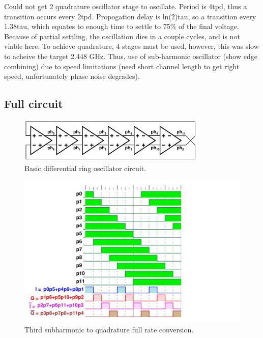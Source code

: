 	 Could not get 2 quadrature oscillator stage to oscillate. Period is 4tpd, thus a transition occurs every 2tpd. Propogation delay is ln(2)tau, so a transition every 1.38tau, which equates to enough time to settle to 75\% of the final voltage. Because of partial settling, the oscillation dies in a couple cycles, and is not viable here. To achieve quadrature, 4 stages must be used, however, this was slow to acheive the target 2.448 GHz. Thus, use of sub-harmonic oscillator (show edge combining) due to speed limitations (need short channel length to get right speed, unfortunately phase noise degrades).

		\subsection{Full circuit}
			\begin{figure}[htb!]
			        \centering
			        \includegraphics[width=0.8\textwidth, angle=0]{./figs/design/ro_6st_simple}
			    \caption{Basic differential ring oscillator circuit.}
			    \label{fig:basic_6stg_ro}
			\end{figure}
			\begin{figure}[htb!]
			        \centering
			        \includegraphics[width=1.0\textwidth, angle=0]{./figs/design/ro_12ph_quad}
			    \caption{Third subharmonic to quadrature full rate conversion.}
			    \label{fig:ro_phases}
			\end{figure}

